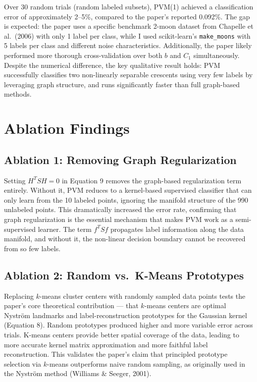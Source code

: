 \documentclass[10pt, conference]{IEEEtran}
\begin{document}
Over 30 random trials (random labeled subsets), PVM(1) achieved a classification error of approximately 2--5\%, compared to the paper's reported 0.092\%. The gap is expected: the paper uses a specific benchmark 2-moon dataset from Chapelle et al.\ (2006) with only 1 label per class, while I used scikit-learn's \texttt{make\_moons} with 5 labels per class and different noise characteristics. Additionally, the paper likely performed more thorough cross-validation over both $b$ and $C_1$ simultaneously. Despite the numerical difference, the key qualitative result holds: PVM successfully classifies two non-linearly separable crescents using very few labels by leveraging graph structure, and runs significantly faster than full graph-based methods.

\section{Ablation Findings}

\subsection{Ablation 1: Removing Graph Regularization}

Setting $H^T S H = 0$ in Equation 9 removes the graph-based regularization term entirely. Without it, PVM reduces to a kernel-based supervised classifier that can only learn from the 10 labeled points, ignoring the manifold structure of the 990 unlabeled points. This dramatically increased the error rate, confirming that graph regularization is the essential mechanism that makes PVM work as a semi-supervised learner. The term $f^T S f$ propagates label information along the data manifold, and without it, the non-linear decision boundary cannot be recovered from so few labels.

\subsection{Ablation 2: Random vs.\ K-Means Prototypes}

Replacing $k$-means cluster centers with randomly sampled data points tests the paper's core theoretical contribution --- that $k$-means centers are optimal Nystr\"{o}m landmarks and label-reconstruction prototypes for the Gaussian kernel (Equation 8). Random prototypes produced higher and more variable error across trials. K-means centers provide better spatial coverage of the data, leading to more accurate kernel matrix approximation and more faithful label reconstruction. This validates the paper's claim that principled prototype selection via $k$-means outperforms naive random sampling, as originally used in the Nystr\"{o}m method (Williams \& Seeger, 2001).
\end{document}
